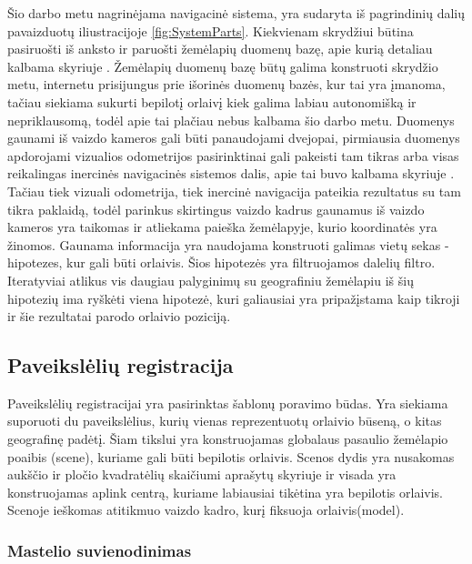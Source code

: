 \documentclass[a4paper,12pt]{article}
\begin{document}
		Šio darbo metu nagrinėjama navigacinė sistema, yra sudaryta iš pagrindinių dalių pavaizduotų iliustracijoje \ref{fig:SystemParts}. Kiekvienam skrydžiui būtina pasiruošti iš anksto ir paruošti žemėlapių duomenų bazę, apie kurią detaliau kalbama skyriuje . Žemėlapių duomenų bazę būtų galima konstruoti skrydžio metu, internetu prisijungus prie išorinės duomenų bazės, kur tai yra įmanoma, tačiau siekiama sukurti bepilotį orlaivį kiek galima labiau autonomišką ir nepriklausomą, todėl apie tai plačiau nebus kalbama šio darbo metu. Duomenys gaunami iš vaizdo kameros gali būti panaudojami dvejopai, pirmiausia duomenys apdorojami vizualios odometrijos pasirinktinai gali pakeisti tam tikras arba visas reikalingas inercinės navigacinės sistemos dalis, apie tai buvo kalbama skyriuje . Tačiau tiek vizuali odometrija, tiek inercinė navigacija pateikia rezultatus su tam tikra paklaidą, todėl parinkus skirtingus vaizdo kadrus gaunamus iš vaizdo kameros yra taikomas  ir atliekama paieška žemėlapyje, kurio koordinatės yra žinomos.
		Gaunama informacija yra naudojama konstruoti galimas vietų sekas - hipotezes, kur gali būti orlaivis. Šios hipotezės yra filtruojamos dalelių filtro. Iteratyviai atlikus vis daugiau palyginimų su geografiniu žemėlapiu iš šių hipotezių ima ryškėti viena hipotezė, kuri galiausiai yra pripažįstama kaip tikroji ir šie rezultatai parodo orlaivio poziciją.
		
		\subsection{Paveikslėlių registracija}
			
			Paveikslėlių registracijai yra pasirinktas šablonų poravimo būdas. Yra siekiama suporuoti du paveikslėlius, kurių vienas reprezentuotų orlaivio būseną, o kitas geografinę padėtį.
			Šiam tikslui yra konstruojamas globalaus pasaulio žemėlapio poaibis (\gls{scene}), kuriame gali būti bepilotis orlaivis. Scenos dydis yra nusakomas aukščio ir pločio kvadratėlių skaičiumi aprašytų skyriuje  ir visada yra konstruojamas aplink centrą, kuriame labiausiai tikėtina yra bepilotis orlaivis. Scenoje ieškomas atitikmuo vaizdo kadro, kurį fiksuoja orlaivis(\gls{model}).

			\subsubsection{Mastelio suvienodinimas}						
			\label{sec:RatioMatch}	
			
\end{document}
